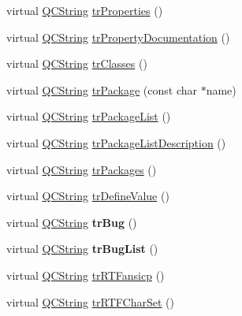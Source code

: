 \begin{DoxyCompactItemize}
\item 
virtual \mbox{\hyperlink{class_q_c_string}{Q\+C\+String}} \mbox{\hyperlink{class_translator_chinese_a9c3996ac3f830460f44ba721fe5ce258}{tr\+Properties}} ()
\item 
virtual \mbox{\hyperlink{class_q_c_string}{Q\+C\+String}} \mbox{\hyperlink{class_translator_chinese_a7edd5b1aba83e5e8897830468b6d805c}{tr\+Property\+Documentation}} ()
\item 
virtual \mbox{\hyperlink{class_q_c_string}{Q\+C\+String}} \mbox{\hyperlink{class_translator_chinese_a215d5da2d3add599b154cf3d53e2ddda}{tr\+Classes}} ()
\item 
virtual \mbox{\hyperlink{class_q_c_string}{Q\+C\+String}} \mbox{\hyperlink{class_translator_chinese_a76e192cdf39ae132fa1d30f757897d58}{tr\+Package}} (const char $\ast$name)
\item 
virtual \mbox{\hyperlink{class_q_c_string}{Q\+C\+String}} \mbox{\hyperlink{class_translator_chinese_a1d59869229bf4e9dab9ae80bcbaddb69}{tr\+Package\+List}} ()
\item 
virtual \mbox{\hyperlink{class_q_c_string}{Q\+C\+String}} \mbox{\hyperlink{class_translator_chinese_ab80bf19ed8915624a5ad251f5c8d217e}{tr\+Package\+List\+Description}} ()
\item 
virtual \mbox{\hyperlink{class_q_c_string}{Q\+C\+String}} \mbox{\hyperlink{class_translator_chinese_a46fb6bff7f64ae756eabaac2bc387d0a}{tr\+Packages}} ()
\item 
virtual \mbox{\hyperlink{class_q_c_string}{Q\+C\+String}} \mbox{\hyperlink{class_translator_chinese_a2b16ef7110e8834820d94724976da3cc}{tr\+Define\+Value}} ()
\item 
\mbox{\label{class_translator_chinese_a80b2609b7331e1f71860bb099eca84c9}} 
virtual \mbox{\hyperlink{class_q_c_string}{Q\+C\+String}} {\bfseries tr\+Bug} ()
\item 
\mbox{\label{class_translator_chinese_a7cbdbfd6285976a95fdde927d0624d14}} 
virtual \mbox{\hyperlink{class_q_c_string}{Q\+C\+String}} {\bfseries tr\+Bug\+List} ()
\item 
virtual \mbox{\hyperlink{class_q_c_string}{Q\+C\+String}} \mbox{\hyperlink{class_translator_chinese_a4f6b051cede382e7d4234506aeaccedb}{tr\+R\+T\+Fansicp}} ()
\item 
virtual \mbox{\hyperlink{class_q_c_string}{Q\+C\+String}} \mbox{\hyperlink{class_translator_chinese_a0935a089ac2dc882cf25fe6cf1185fee}{tr\+R\+T\+F\+Char\+Set}} ()

\end{DoxyCompactItemize}
